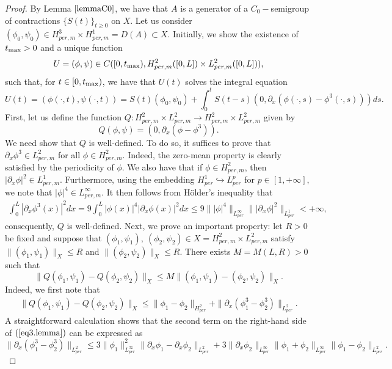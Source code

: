 \documentclass[12pt,reqno,a4paper]{amsart} %
\numberwithin{equation}{section}
\numberwithin{figure}{section}
\begin{document}
\begin{proof}
	
By Lemma $\ref{lemmaC0}$, we have that $A$ is a generator of a $C_0-$semigroup of 
contractions $\{S(t)\}_{t\geq0}$ on $X$. Let us consider $(\phi_0,\psi_0)\in H_{per,m}^3\times H_{per,m}^1=D(A)\subset X$. Initially, we show the existence of $t_{\rm{max}}>0$ and a unique function 
\begin{equation}\label{eq1.lemma}
	U=(\phi,\psi)\in C([0,t_{\rm{max}}),H_{per,m}^2([0,L])\times L_{per,m}^2([0,L])), 
\end{equation}
such that, for $t\in [0,t_{\rm{max}})$, we have that $U(t)$ solves the integral equation
\begin{equation}\label{eq2.lemma}
	U(t)=(\phi(\cdot, t), \psi(\cdot, t))=S(t)(\phi_0,\psi_0)+\int_{0}^{t}S(t-s)(0,\partial_x(\phi(\cdot,s)-\phi^3(\cdot,s)))ds. 
\end{equation}
First, let us define the function $Q:H_{per,m}^2\times L_{per,m}^2\rightarrow H_{per,m}^2\times L_{per,m}^2$ given by $$Q(\phi,\psi)=(0, \partial_x(\phi-\phi^3)).$$ We need show that $Q$ is well-defined. To do so, it suffices to prove that $\partial_x \phi ^3 \in L_{per,m}^2 $ for all $\phi \in H_{per,m}^2$. Indeed, the zero-mean property is clearly satisfied by the periodicity of $\phi$. We also have that if $\phi \in H_{per,m}^2$, then $|\partial_x\phi|^2 \in L_{per,m}^1$. Furthermore, using the embedding $H_{per}^1 \hookrightarrow  L_{per}^p$ for $p\in [1,+\infty]$, we note that $|\phi|^4\in  L_{per,m}^\infty$. It then follows from Hölder's inequality that
\begin{align*}
\int_{0}^{L} |\partial_x \phi ^3 (x)|^2dx=9 \int_{0}^{L} |\phi(x)|^4|\partial_x \phi(x) |^2dx\leq 9 \||\phi|^4\|_{ L_{per}^\infty}\||\partial_x \phi|^2\|_{L_{per}^1}<+\infty,
\end{align*}consequently, $Q$ is well-defined. Next, we prove an important property: let $R>0$ be fixed and suppose that 
 $(\phi_1, \psi_1), \  (\phi_2, \psi_2)\in X=H_{per,m}^2\times L_{per,m}^2$ satisfy $\| (\phi_1, \psi_1)\|_{X}\leq R$ and  $\| (\phi_2, \psi_2)\|_{X}\leq R$. There exists $M=M(L,R)>0$ such that
   \begin{equation}\label{eq7.1.lemma}  
 	\|Q(\phi_1, \psi_1)-Q(\phi_2, \psi_2)\|_X\leq  M \|(\phi_1,\psi_1)-(\phi_2, \psi_2)\|_X.
 \end{equation}
Indeed, we first note that
 \begin{align}\label{eq3.lemma}
 	\|Q(\phi_1, \psi_1)-Q(\phi_2, \psi_2)\|_X\leq\| \phi_1-\phi_2\|_{H_{per}^2}+ \|\partial_x (\phi_1^3-\phi_2^3)\|_{L_{per}^2} .
 \end{align}
A straightforward calculation shows that the second term on the right-hand side of $(\ref{eq3.lemma})$ can be expressed as
 \begin{equation}
 	\|\partial_x (\phi_1^3-\phi_2^3)\|_{L_{per}^2}\leq 3\|\phi_1\|_{L_{per}^\infty}^2 \|\partial_x\phi_1-\partial_x\phi_2 \|_{L_{per}^2}+3\|\partial_x\phi_2\|_{L_{per}^\infty} \| \phi_1 +\phi_2  \|_{L_{per}^\infty} \|\phi_1 -\phi_2  \|_{L_{per}^2}. 
\label{eq5.lemma}
\end{equation}


\end{proof}
\end{document}
